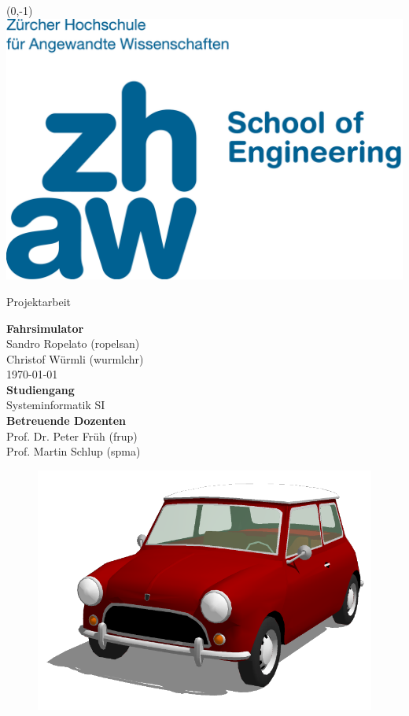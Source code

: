 %
%


\begin{titlepage}
\cleardoublepage

\begin{textblock}{10}(0,-1)
\includegraphics[width=0.3\linewidth]{src/ZHAWlogo2.pdf}
\end{textblock}

\center

\Large{\textsf{Projektarbeit}}
\vspace{1em}

\Huge{\textsf{\textbf{Fahrsimulator}}}
\vspace{2em}
\\
\Large{
	\textsf{
		Sandro Ropelato (ropelsan)\\
		Christof Würmli (wurmlchr)\\
		\vspace{2em}
		\today\\
		\vspace{2em}
		\textbf{Studiengang}\\
		Systeminformatik SI\\
		\vspace{3em}
		\textbf{Betreuende Dozenten}\\
		Prof. Dr. Peter Früh (frup)\\
		Prof. Martin Schlup (spma)	
	}
}\\

\vspace{4em}

\begin{figure}[htbp]
\centering 
\includegraphics[width=0.5\linewidth]{src/MiniCooper.png}
\end{figure}

\end{titlepage}
